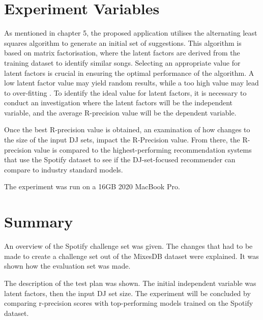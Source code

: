 \section{Experiment Variables}

As mentioned in chapter 5, the proposed application utilises the alternating least squares algorithm to generate an initial set of suggestions. This algorithm is based on matrix factorisation, where the latent factors are derived from the training dataset to identify similar songs. Selecting an appropriate value for latent factors is crucial in ensuring the optimal performance of the algorithm. A low latent factor value may yield random results, while a too high value may lead to over-fitting \citep{zhou_large-scale_2008}. To identify the ideal value for latent factors, it is necessary to conduct an investigation where the latent factors will be the independent variable, and the average R-precision value will be the dependent variable. 

Once the best R-precision value is obtained, an examination of how changes to the size of the input DJ sets, impact the R-Precision value. From there, the R-precision value is compared to the highest-performing recommendation systems that use the Spotify dataset to see if the DJ-set-focused recommender can compare to industry standard models.

The experiment was run on a 16GB 2020 MacBook Pro.

\section{Summary}
An overview of the Spotify challenge set was given. The changes that had to be made to create a challenge set out of the MixesDB dataset were explained. It was shown how the evaluation set was made. 

The description of the test plan was shown. The initial independent variable was latent factors, then the input DJ set size. The experiment will be concluded by comparing r-precision scores with top-performing models trained on the Spotify dataset.

